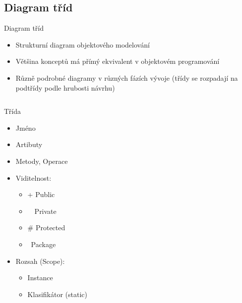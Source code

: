\subsection{Diagram tříd}




\begin{frame}{Diagram tříd}

\begin{itemize}[<+->]
    \item<+->Strukturní diagram objektového modelování
    \item<+->Většina konceptů má přímý ekvivalent v objektovém programování
    \item<+->Různě podrobné diagramy v různých fázích vývoje 
             (třídy se rozpadají na podtřídy podle hrubosti návrhu)
\end{itemize}

\begin{columns}[T]

    \begin{column}{0.45\textwidth}
        Třída  
        \begin{itemize}[<+->]
            \item<+->Jméno
            \item<+->Artibuty
            \item<+->Metody, Operace
            \item<+->Viditelnost:
            \begin{itemize}
                \item + Public
                \item \textendash ~~Private
                \item \# Protected
                \item  ~Package
            \end{itemize}
            
            \item<+->Rozsah (Scope):
            \begin{itemize}
                \item Instance
                \item Klasifikátor (static)
            \end{itemize}
        \end{itemize}
    \end{column}

    \begin{column}{0.55\textwidth}
		\onslide<4->
		\begin{figure}
		\end{figure}
    \end{column}

\end{columns}
\end{frame}

